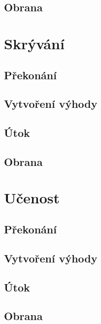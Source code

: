 \documentclass[../main.tex]{subfiles}
\begin{document}
\subsection*{Obrana}
\label{subsec:remesla-obrana}
\obrana

\section{Skrývání}
\label{sec:skryvani}

\subsection*{Překonání}
\label{subsec:skryvani-prekonani}
\prekonani

\subsection*{Vytvoření výhody}
\label{subsec:skryvani-vytvoreni}
\vytvoreni

\subsection*{Útok}
\label{subsec:skryvani-utok}
\utok

\subsection*{Obrana}
\label{subsec:skryvani-obrana}

\section{Učenost}
\label{sec:ucenost}

\subsection*{Překonání}
\label{subsec:ucenost-prekonani}
\prekonani

\subsection*{Vytvoření výhody}
\label{subsec:ucenost-vytvoreni}
\vytvoreni

\subsection*{Útok}
\label{subsec:ucenost-utok}
\utok

\subsection*{Obrana}
\label{subsec:ucenost-obrana}
\obrana
\end{document}
